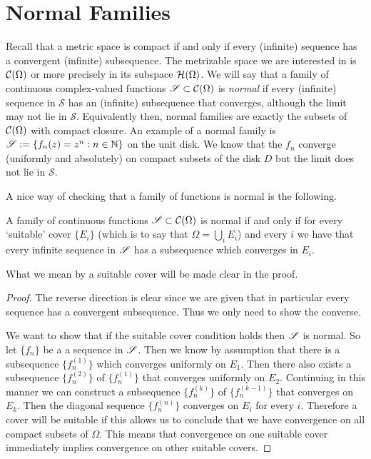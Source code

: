 \section{Normal Families}
Recall that a metric space is compact if and only if every (infinite) sequence has a convergent (infinite) subsequence. The metrizable space we are interested in is $\mathcal{C}(\Omega)$ or more precisely in its subspace $\mathcal{H}(\Omega)$. We will say that a family of continuous complex-valued functions $\mathscr{S} \subset \mathcal{C}(\Omega)$ is \textit{normal} if every (infinite) sequence in $\mathscr{S}$ has an (infinite) subsequence that converges, although the limit may not lie in $\mathscr{S}$. Equivalently then, normal families are exactly the subsets of $\mathcal{C}(\Omega)$ with compact closure. An example of a normal family is $\mathscr{S} := \{f_n(z) = z^n : n \in \mathbb{N}\}$ on the unit disk. We know that the $f_n$ converge (uniformly and absolutely) on compact subsets of the disk $D$ but the limit does not lie in $\mathscr{S}$.

A nice way of checking that a family of functions is normal is the following.
\begin{lemma}\label{lem:suitable-cover}
    A family of continuous functions $\mathscr{S} \subset \mathcal{C}(\Omega)$ is normal if and only if for every `suitable' cover $\{E_i\}$ (which is to say that $\Omega = \bigcup_i E_i$) and every $i$ we have that every infinite sequence in $\mathscr{S}$ has a subsequence which converges in $E_i$.
\end{lemma}
\begin{remark}
    What we mean by a suitable cover will be made clear in the proof.
\end{remark}
\begin{proof}
    The reverse direction is clear since we are given that in particular every sequence has a convergent subsequence. Thus we only need to show the converse. 
    
    We want to show that if the suitable cover condition holds then $\mathscr{S}$ is normal. So let $\{f_n\}$ be a a sequence in $\mathscr{S}$. Then we know by assumption that there is a subsequence $\{f_n^{(1)}\}$ which converges uniformly on $E_1$. Then there also exists a subsequence $\{f_n^{(2)}\}$ of $\{f_n^{(1)}\}$ that converges uniformly on $E_2$. Continuing in this manner we can construct a subsequence $\{f_n^{(k)}\}$ of $\{f_n^{(k - 1)}\}$ that converges on $E_k$. Then the diagonal sequence $\{f_n^{(n)}\}$ converges on $E_i$ for every $i$. Therefore a cover will be suitable if this allows us to conclude that we have convergence on all compact subsets of $\Omega$. This means that convergence on one suitable cover immediately implies convergence on other suitable covers.
\end{proof}

